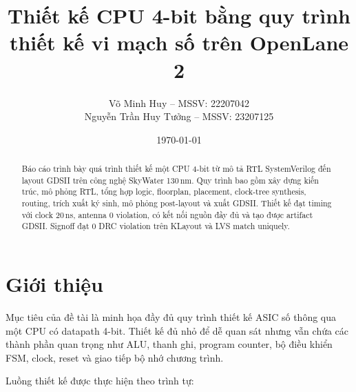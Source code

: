 \documentclass[12pt,a4paper]{article}
\title{\textbf{Thiết kế CPU 4-bit bằng quy trình thiết kế vi mạch số trên OpenLane 2}}
\author{Võ Minh Huy -- MSSV: 22207042\\
Nguyễn Trần Huy Tưởng -- MSSV: 23207125}
\date{\today}
\begin{document}
\maketitle

\begin{abstract}
Báo cáo trình bày quá trình thiết kế một CPU 4-bit từ mô tả RTL
SystemVerilog đến layout GDSII trên công nghệ SkyWater 130\,nm. Quy trình
bao gồm xây dựng kiến trúc, mô phỏng RTL, tổng hợp logic, floorplan,
placement, clock-tree synthesis, routing, trích xuất ký sinh, mô phỏng
post-layout và xuất GDSII. Thiết kế đạt timing với clock 20\,ns, antenna
0 violation, có kết nối nguồn đầy đủ và tạo được artifact GDSII. Signoff
đạt 0 DRC violation trên KLayout và LVS match uniquely.
\end{abstract}

\tableofcontents
\newpage

\section{Giới thiệu}

Mục tiêu của đề tài là minh họa đầy đủ quy trình thiết kế ASIC số thông
qua một CPU có datapath 4-bit. Thiết kế đủ nhỏ để dễ quan sát nhưng vẫn
chứa các thành phần quan trọng như ALU, thanh ghi, program counter, bộ
điều khiển FSM, clock, reset và giao tiếp bộ nhớ chương trình.

Luồng thiết kế được thực hiện theo trình tự:

\begin{center}
\end{center}
\end{document}
